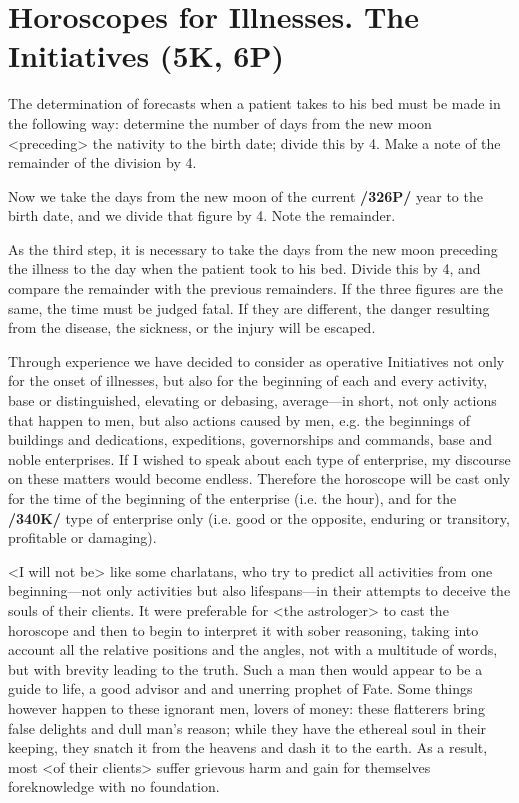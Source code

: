 \section{Horoscopes for Illnesses. The Initiatives (5K, 6P)}

The determination of forecasts when a patient takes to his bed must be made in the following way: determine the number of days from the new moon <preceding> the nativity to the birth date; divide this by
4. Make a note of the remainder of the division by 4. 

Now we take the days from the new moon of the current \textbf{/326P/} year to the birth date, and we divide that figure by 4. Note the remainder. 

As the third step, it is necessary to take the days from the new moon preceding the illness to the day when the patient took to his bed. Divide this by 4, and compare the remainder with the previous remainders. If the three figures are the same, the time must be judged fatal. If they are different, the danger resulting from the disease, the sickness, or the injury will be escaped.

Through experience we have decided to consider as operative Initiatives not only for the onset of illnesses, but also for the beginning of each and every activity, base or distinguished, elevating or debasing,
average—in short, not only actions that happen to men, but also actions caused by men, e.g. the beginnings of buildings and dedications, expeditions, governorships and commands, base and noble
enterprises. If I wished to speak about each type of enterprise, my discourse on these matters would become endless. Therefore the horoscope will be cast only for the time of the beginning of the enterprise (i.e. the hour), and for the \textbf{/340K/} type of enterprise only (i.e. good or the opposite, enduring or transitory, profitable or damaging).

<I will not be> like some charlatans, who try to predict all activities from one beginning—not only activities but also lifespans—in their attempts to deceive the souls of their clients. It were preferable for
<the astrologer> to cast the horoscope and then to begin to interpret it with sober reasoning, taking into account all the relative positions and the angles, not with a multitude of words, but with brevity leading to
the truth. Such a man then would appear to be a guide to life, a good advisor and and unerring prophet of Fate. Some things however happen to these ignorant men, lovers of money: these flatterers bring false delights and dull man’s reason; while they have the ethereal soul in their keeping, they snatch it from the heavens and dash it to the earth. As a result, most <of their clients> suffer grievous harm and gain for themselves foreknowledge with no foundation.
 
\newpage
